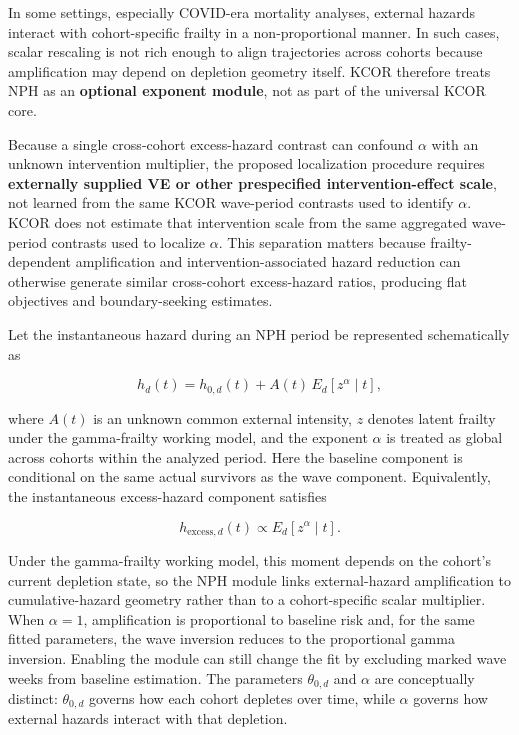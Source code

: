 \documentclass[
]{article}
\begin{document}
In some settings, especially COVID-era mortality analyses, external hazards interact with cohort-specific frailty in a non-proportional manner. In such cases, scalar rescaling is not rich enough to align trajectories across cohorts because amplification may depend on depletion geometry itself. KCOR therefore treats NPH as an \textbf{optional exponent module}, not as part of the universal KCOR core.

Because a single cross-cohort excess-hazard contrast can confound \(\alpha\) with an unknown intervention multiplier, the proposed localization procedure requires \textbf{externally supplied VE or other prespecified intervention-effect scale}, not learned from the same KCOR wave-period contrasts used to identify \(\alpha\). KCOR does not estimate that intervention scale from the same aggregated wave-period contrasts used to localize \(\alpha\). This separation matters because frailty-dependent amplification and intervention-associated hazard reduction can otherwise generate similar cross-cohort excess-hazard ratios, producing flat objectives and boundary-seeking estimates.

Let the instantaneous hazard during an NPH period be represented schematically as

\[h_d(t) = h_{0,d}(t) + A(t)\,E_d[z^{\alpha}\mid t],\]

where \(A(t)\) is an unknown common external intensity, \(z\) denotes latent frailty under the gamma-frailty working model, and the exponent \(\alpha\) is treated as global across cohorts within the analyzed period. Here the baseline component is conditional on the same actual survivors as the wave component. Equivalently, the instantaneous excess-hazard component satisfies

\[h_{\mathrm{excess},d}(t)\propto E_d[z^{\alpha}\mid t].\]

Under the gamma-frailty working model, this moment depends on the cohort's current depletion state, so the NPH module links external-hazard amplification to cumulative-hazard geometry rather than to a cohort-specific scalar multiplier. When \(\alpha=1\), amplification is proportional to baseline risk and, for the same fitted parameters, the wave inversion reduces to the proportional gamma inversion. Enabling the module can still change the fit by excluding marked wave weeks from baseline estimation. The parameters \(\theta_{0,d}\) and \(\alpha\) are conceptually distinct: \(\theta_{0,d}\) governs how each cohort depletes over time, while \(\alpha\) governs how external hazards interact with that depletion.
\end{document}

